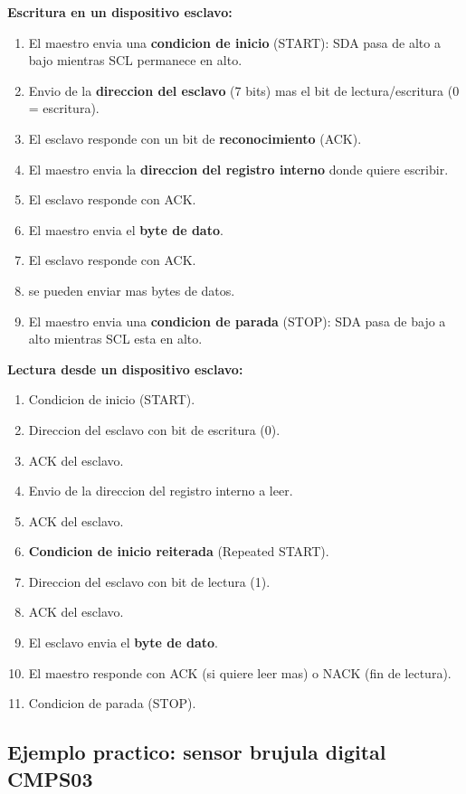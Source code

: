 \textbf{Escritura en un dispositivo esclavo:}

\begin{enumerate}
    \item El maestro envia una \textbf{condicion de inicio} (START): SDA pasa de
    alto a bajo mientras SCL permanece en alto.
    \item Envio de la \textbf{direccion del esclavo} (7 bits) mas el bit de
    lectura/escritura (0 = escritura).
    \item El esclavo responde con un bit de \textbf{reconocimiento} (ACK).
    \item El maestro envia la \textbf{direccion del registro interno} donde quiere
    escribir.
    \item El esclavo responde con ACK.
    \item El maestro envia el \textbf{byte de dato}.
    \item El esclavo responde con ACK.
    \item [Opcionalmente] se pueden enviar mas bytes de datos.
    \item El maestro envia una \textbf{condicion de parada} (STOP): SDA pasa de
    bajo a alto mientras SCL esta en alto.
\end{enumerate}

\textbf{Lectura desde un dispositivo esclavo:}

\begin{enumerate}
    \item Condicion de inicio (START).
    \item Direccion del esclavo con bit de escritura (0).
    \item ACK del esclavo.
    \item Envio de la direccion del registro interno a leer.
    \item ACK del esclavo.
    \item \textbf{Condicion de inicio reiterada} (Repeated START).
    \item Direccion del esclavo con bit de lectura (1).
    \item ACK del esclavo.
    \item El esclavo envia el \textbf{byte de dato}.
    \item El maestro responde con ACK (si quiere leer mas) o NACK (fin de lectura).
    \item Condicion de parada (STOP).
\end{enumerate}

\subsection{Ejemplo practico: sensor brujula digital CMPS03}

